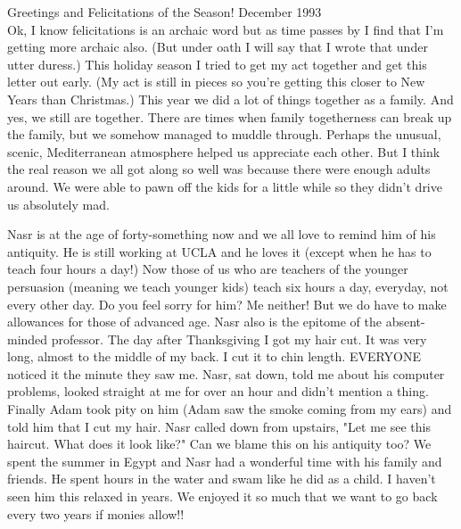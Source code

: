 
%

Greetings and Felicitations of the Season! \hfill December 1993\\

Ok, I know felicitations is an archaic word but as time passes by I find that I'm getting more archaic also. (But under oath I will say that I
wrote that under utter duress.) This holiday season I tried to get my act together and get this letter out early. (My act is still in pieces so
you're getting this closer to New Years than Christmas.) This year we did a lot of things together as a family. And yes, we still are together.
There are times when family togetherness can break up the family, but we somehow managed to muddle through. Perhaps the unusual, scenic,
Mediterranean atmosphere helped us appreciate each other. But I think the real reason we all got along so well was because there were enough
adults around. We were able to pawn off the kids for a little while so they didn't drive us absolutely mad.

Nasr is at the age of forty-something now and we all love to remind him of his antiquity. He is still working at UCLA and he loves it (except
when he has to teach four hours a day!) Now those of us who are teachers of the younger persuasion (meaning we teach younger kids) teach six
hours a day, everyday, not every other day. Do you feel sorry for him? Me neither! But we do have to make allowances for those of advanced age.
Nasr also is the epitome of the absent-minded professor. The day after Thanksgiving I got my hair cut. It was very long, almost to the middle of
my back. I cut it to chin length. EVERYONE noticed it the minute they saw me. Nasr, sat down, told me about his computer problems, looked
straight at me for over an hour and didn't mention a thing. Finally Adam took pity on him (Adam saw the smoke coming from my ears) and told him
that I cut my hair. Nasr called down from upstairs, "Let me see this haircut. What does it look like?" Can we blame this on his antiquity too?
We spent the summer in Egypt and Nasr had a wonderful time with his family and friends. He spent hours in the water and swam like he did as a
child. I haven't seen him this relaxed in years. We enjoyed it so much that we want to go back every two years if monies allow!!


